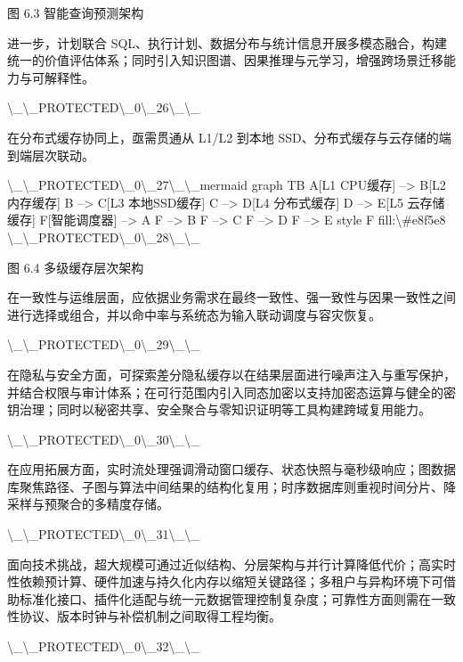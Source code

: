 图 6.3 智能查询预测架构

进一步，计划联合 SQL、执行计划、数据分布与统计信息开展多模态融合，构建统一的价值评估体系；同时引入知识图谱、因果推理与元学习，增强跨场景迁移能力与可解释性。

\textbackslash{}_\textbackslash{}_PROTECTED\textbackslash{}_0\textbackslash{}_26\textbackslash{}_\textbackslash{}_

在分布式缓存协同上，亟需贯通从 L1/L2 到本地 SSD、分布式缓存与云存储的端到端层次联动。

\textbackslash{}_\textbackslash{}_PROTECTED\textbackslash{}_0\textbackslash{}_27\textbackslash{}_\textbackslash{}_mermaid
graph TB
    A[L1 CPU缓存] --> B[L2 内存缓存]
    B --> C[L3 本地SSD缓存]
    C --> D[L4 分布式缓存]
    D --> E[L5 云存储缓存]
    F[智能调度器] --> A
    F --> B
    F --> C
    F --> D
    F --> E
    style F fill:\textbackslash{}#e8f5e8
\textbackslash{}_\textbackslash{}_PROTECTED\textbackslash{}_0\textbackslash{}_28\textbackslash{}_\textbackslash{}_

图 6.4 多级缓存层次架构

在一致性与运维层面，应依据业务需求在最终一致性、强一致性与因果一致性之间进行选择或组合，并以命中率与系统态为输入联动调度与容灾恢复。

\textbackslash{}_\textbackslash{}_PROTECTED\textbackslash{}_0\textbackslash{}_29\textbackslash{}_\textbackslash{}_

在隐私与安全方面，可探索差分隐私缓存以在结果层面进行噪声注入与重写保护，并结合权限与审计体系；在可行范围内引入同态加密以支持加密态运算与健全的密钥治理；同时以秘密共享、安全聚合与零知识证明等工具构建跨域复用能力。

\textbackslash{}_\textbackslash{}_PROTECTED\textbackslash{}_0\textbackslash{}_30\textbackslash{}_\textbackslash{}_

在应用拓展方面，实时流处理强调滑动窗口缓存、状态快照与毫秒级响应；图数据库聚焦路径、子图与算法中间结果的结构化复用；时序数据库则重视时间分片、降采样与预聚合的多精度存储。

\textbackslash{}_\textbackslash{}_PROTECTED\textbackslash{}_0\textbackslash{}_31\textbackslash{}_\textbackslash{}_

面向技术挑战，超大规模可通过近似结构、分层架构与并行计算降低代价；高实时性依赖预计算、硬件加速与持久化内存以缩短关键路径；多租户与异构环境下可借助标准化接口、插件化适配与统一元数据管理控制复杂度；可靠性方面则需在一致性协议、版本时钟与补偿机制之间取得工程均衡。

\textbackslash{}_\textbackslash{}_PROTECTED\textbackslash{}_0\textbackslash{}_32\textbackslash{}_\textbackslash{}_

